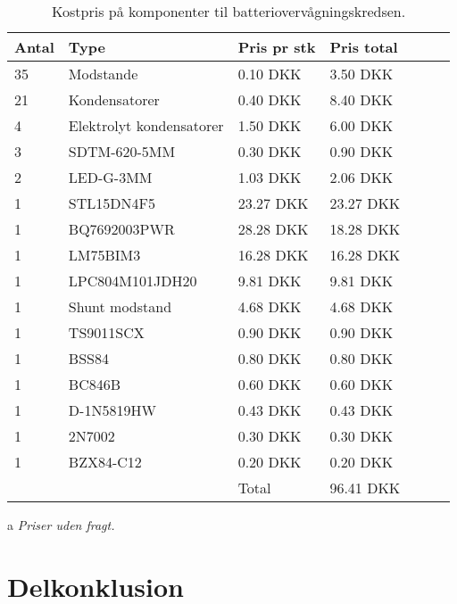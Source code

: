 \begin{table}[h!]
	\small
	\centering
	\label{tab:pris_ic}
	\begin{threeparttable}
		\begin{tabular}{ l l l l l l l }
			\toprule
			\multicolumn{1}{l}{\textbf{Antal}}        &
			\multicolumn{1}{l}{\textbf{Type}}         &
			\multicolumn{1}{l}{\textbf{Pris pr stk}}  &
			\multicolumn{1}{l}{\textbf{Pris total}}   \\ 
			\hline
			35 &  Modstande                 &  0.10 DKK   &  3.50 DKK  \\
			21 &  Kondensatorer             &  0.40 DKK   &  8.40 DKK  \\
			4  &  Elektrolyt kondensatorer  &  1.50 DKK   &  6.00 DKK  \\
			3  &  SDTM-620-5MM              &  0.30 DKK   &  0.90 DKK  \\
			2  &  LED-G-3MM                 &  1.03 DKK   &  2.06 DKK  \\
			1  &  STL15DN4F5                & 23.27 DKK   & 23.27 DKK  \\
			1  &  BQ7692003PWR              & 28.28 DKK   & 18.28 DKK  \\
			1  &  LM75BIM3                  & 16.28 DKK   & 16.28 DKK  \\
			1  &  LPC804M101JDH20           &  9.81 DKK   &  9.81 DKK  \\
			1  &  Shunt modstand            &  4.68 DKK   &  4.68 DKK  \\
			1  &  TS9011SCX                 &  0.90 DKK   &  0.90 DKK  \\
			1  &  BSS84                     &  0.80 DKK   &  0.80 DKK  \\
			1  &  BC846B                    &  0.60 DKK   &  0.60 DKK  \\
			1  &  D-1N5819HW                &  0.43 DKK   &  0.43 DKK  \\
			1  &  2N7002                    &  0.30 DKK   &  0.30 DKK  \\
			1  &  BZX84-C12                 &  0.20 DKK   &  0.20 DKK  \\  
			\hline
			   &                            & Total       & 96.41 DKK  \\  
			\hline
			\bottomrule
		\end{tabular}
		\begin{tablenotes}
			\item[a] \textit{Priser uden fragt.}
		\end{tablenotes}
		\caption{Kostpris på komponenter til batteriovervågningskredsen.}
	\end{threeparttable}
\end{table} 
\FloatBlock

\section{Delkonklusion}